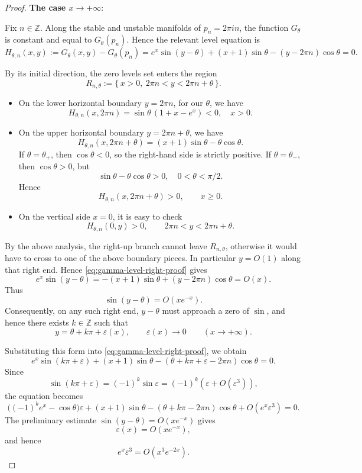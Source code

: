 \documentclass[11pt]{amsart}
\theoremstyle{plain}
\begin{document}
\begin{proof} 
\noindent\textbf{The case $x\rightarrow+\infty$}:

Fix \(n\in\mathbb Z\).  Along the stable and unstable manifolds of
\(p_n=2\pi i n\), the function \(G_\theta\) is constant and equal to
\(G_\theta(p_n)\).  Hence the relevant level equation is
\begin{equation}\label{eq:gamma-level-right-proof}
H_{\theta,n}(x,y):=
G_\theta(x,y)-G_\theta(p_n)
=
e^x\sin(y-\theta)+(x+1)\sin\theta-(y-2\pi n)\cos\theta
=0 .
\end{equation}



By its initial direction, the zero levels set enters the region
\[
  R_{n,\theta}
  :=
  \{\,x>0,\ 2\pi n<y<2\pi n+\theta\,\}.
\]
\begin{itemize}
    \item On the lower horizontal boundary \(y=2\pi n\), for our $\theta$, we have
\[
  H_{\theta,n}(x,2\pi n)
  =
  \sin\theta\,(1+x-e^x)<0,\quad x>0.
\]
    \item On the upper horizontal boundary \(y=2\pi n+\theta\), we have
\[
  H_{\theta,n}(x,2\pi n+\theta)
  =
  (x+1)\sin\theta-\theta\cos\theta .
\]
If \(\theta=\theta_+\), then \(\cos\theta<0\), so the right-hand side is
strictly positive. If \(\theta=\theta_-\), then \(\cos\theta>0\), but
\[
  \sin\theta-\theta\cos\theta>0,\quad 0<\theta<\pi/2.
\] 
Hence
\[
  H_{\theta,n}(x,2\pi n+\theta)>0,
  \qquad x\geq 0 .
\]
\item On the  vertical side \(x=0\), it is easy to check 
\[
  H_{\theta,n}(0,y)>0,
  \qquad 2\pi n<y<2\pi n+\theta.
\]
\end{itemize}
By the above analysis, the right-up branch
cannot leave \(R_{n,\theta}\), otherwise it would have to cross to one of the above boundary pieces. In particular \(y=O(1)\)
along that right end. Hence
\eqref{eq:gamma-level-right-proof} gives
\[
e^x\sin(y-\theta)
=
-(x+1)\sin\theta+(y-2\pi n)\cos\theta
=
O(x).
\]
Thus
\[
\sin(y-\theta)=O(xe^{-x}).
\]
Consequently, on any such right end, \(y-\theta\) must approach a zero of
\(\sin\), and hence there exists \(k\in\mathbb Z\) such that
\[
y=\theta+k\pi+\varepsilon(x),
\qquad
\varepsilon(x)\to 0
\qquad
(x\to+\infty).
\]

Substituting this form into \eqref{eq:gamma-level-right-proof}, we obtain
\[
e^x\sin(k\pi+\varepsilon)
+(x+1)\sin\theta
-(\theta+k\pi+\varepsilon-2\pi n)\cos\theta
=0.
\]
Since
\[
\sin(k\pi+\varepsilon)=(-1)^k\sin\varepsilon
=
(-1)^k\left(\varepsilon+O(\varepsilon^3)\right),
\]
the equation becomes
\[
\bigl((-1)^k e^x-\cos\theta\bigr)\varepsilon
+
(x+1)\sin\theta
-
(\theta+k\pi-2\pi n)\cos\theta
+
O(e^x\varepsilon^3)
=0.
\]
The preliminary estimate \(\sin(y-\theta)=O(xe^{-x})\) gives
\[
\varepsilon(x)=O(xe^{-x}),
\]
and hence
\[
e^x\varepsilon^3=O(x^3e^{-2x}).
\]


\end{proof}
\end{document}
